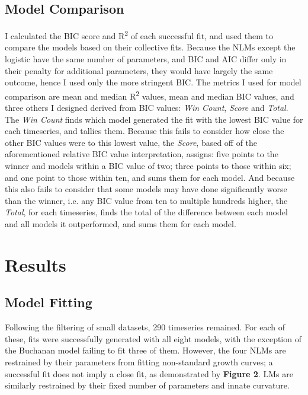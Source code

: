 \documentclass[11pt]{article}
\begin{document}
\subsection{Model Comparison}
I calculated the BIC score and R\textsuperscript{2} of each successful fit, and used them to compare the models based on their collective fits. Because the NLMs except the logistic have the same number of parameters, and BIC and AIC differ only in their penalty for additional parameters, they would have largely the same outcome, hence I used only the more stringent BIC.
The metrics I used for model comparison are mean and median R\textsuperscript{2} values, mean and median BIC values, and three others I designed derived from BIC values: \textit{Win Count}, \textit{Score} and \textit{Total}. The \textit{Win Count} finds which model generated the fit with the lowest BIC value for each timeseries, and tallies them. Because this fails to consider how close the other BIC values were to this lowest value, the \textit{Score}, based off of the aforementioned relative BIC value interpretation, assigns: five points to the winner and models within a BIC value of two; three points to those within six; and one point to those within ten, and sums them for each model. And because this also fails to consider that some models may have done significantly worse than the winner, i.e. any BIC value from ten to multiple hundreds higher, the \textit{Total}, for each timeseries, finds the total of the difference between each model and all models it outperformed, and sums them for each model.



\section{Results}%


\subsection{Model Fitting}

Following the filtering of small datasets, 290 timeseries remained. For each of these, fits were successfully generated with all eight models, with the exception of the Buchanan model failing to fit three of them. However, the four NLMs are restrained by their parameters from fitting non-standard growth curves; a successful fit does not imply a close fit, as demonstrated by \textbf{Figure 2}. LMs are similarly restrained by their fixed number of parameters and innate curvature.
\end{document}
